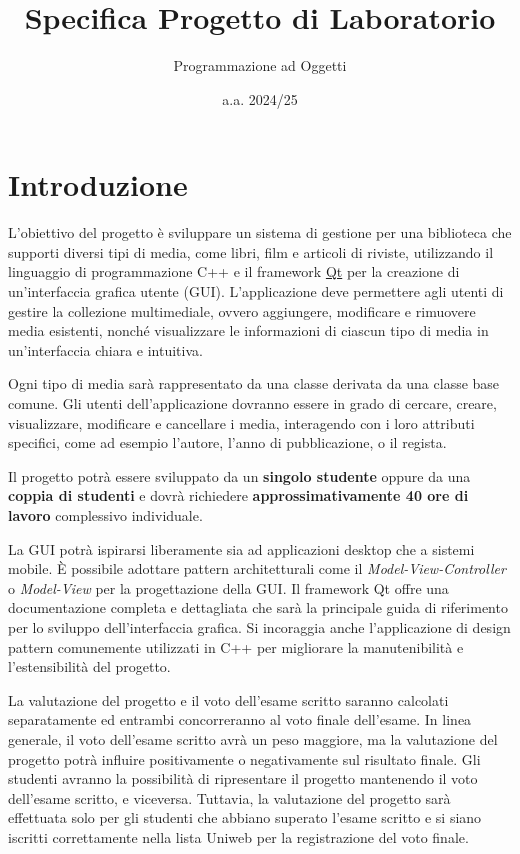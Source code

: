 \documentclass[10pt,a4paper,oneside]{article}
\title{Specifica Progetto di Laboratorio}
\author{Programmazione ad Oggetti}
\date{a.a. 2024/25}
\begin{document}
\maketitle

\section{Introduzione}
L'obiettivo del progetto è sviluppare un sistema di gestione per una biblioteca che supporti diversi tipi di media, come libri, film e articoli di riviste, utilizzando il linguaggio di programmazione C++ e il framework \href{https://www.qt.io/?hsLang=en}{Qt} per la creazione di un'interfaccia grafica utente (GUI). L'applicazione deve permettere agli utenti di gestire la collezione multimediale, ovvero aggiungere, modificare e rimuovere media esistenti, nonché visualizzare le informazioni di ciascun tipo di media in un'interfaccia chiara e intuitiva.

Ogni tipo di media sarà rappresentato da una classe derivata da una classe base comune. Gli utenti dell'applicazione dovranno essere in grado di cercare, creare, visualizzare, modificare e cancellare i media, interagendo con i loro attributi specifici, come ad esempio l'autore, l'anno di pubblicazione, o il regista.

Il progetto potrà essere sviluppato da un \textbf{singolo studente} oppure da una \textbf{coppia di studenti} e dovrà richiedere \textbf{approssimativamente 40 ore di lavoro} complessivo individuale.

La GUI potrà ispirarsi liberamente sia ad applicazioni desktop che a sistemi mobile. È possibile adottare pattern architetturali come il \emph{Model-View-Controller} o \emph{Model-View} per la progettazione della GUI. Il framework Qt offre una documentazione completa e dettagliata che sarà la principale guida di riferimento per lo sviluppo dell'interfaccia grafica. Si incoraggia anche l'applicazione di design pattern comunemente utilizzati in C++ per migliorare la manutenibilità e l'estensibilità del progetto.

La valutazione del progetto e il voto dell'esame scritto saranno calcolati separatamente ed entrambi concorreranno al voto finale dell'esame. In linea generale, il voto dell'esame scritto avrà un peso maggiore, ma la valutazione del progetto potrà influire positivamente o negativamente sul risultato finale. Gli studenti avranno la possibilità di ripresentare il progetto mantenendo il voto dell'esame scritto, e viceversa. Tuttavia, la valutazione del progetto sarà effettuata solo per gli studenti che abbiano superato l'esame scritto e si siano iscritti correttamente nella lista Uniweb per la registrazione del voto finale.
\end{document}
